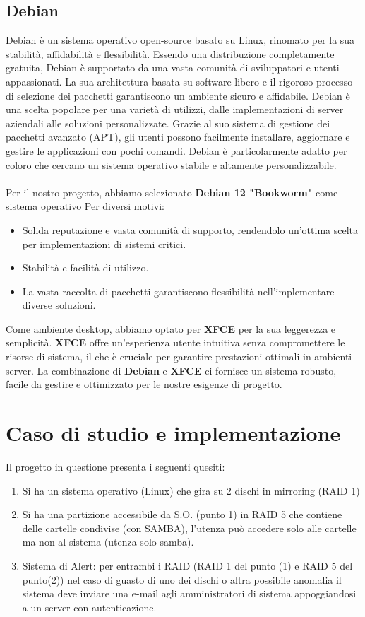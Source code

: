 \documentclass[11pt]{article}
\begin{document}
\subsection{Debian}
Debian è un sistema operativo open-source basato su Linux, rinomato per la sua stabilità, affidabilità e flessibilità. Essendo una distribuzione completamente gratuita, Debian è supportato da una vasta comunità di sviluppatori e utenti appassionati. La sua architettura basata su software libero e il rigoroso processo di selezione dei pacchetti garantiscono un ambiente sicuro e affidabile. Debian è una scelta popolare per una varietà di utilizzi, dalle implementazioni di server aziendali alle soluzioni personalizzate. Grazie al suo sistema di gestione dei pacchetti avanzato (APT), gli utenti possono facilmente installare, aggiornare e gestire le applicazioni con pochi comandi. Debian è particolarmente adatto per coloro che cercano un sistema operativo stabile e altamente personalizzabile.
\\\\
Per il nostro progetto, abbiamo selezionato \textbf{Debian 12 "Bookworm"} come sistema operativo Per diversi motivi:
\begin{itemize}
    \item Solida reputazione e vasta comunità di supporto, rendendolo un'ottima scelta per implementazioni di sistemi critici.
    \item Stabilità e facilità di utilizzo.
    \item La vasta raccolta di pacchetti garantiscono flessibilità nell'implementare diverse soluzioni.
\end{itemize}
Come ambiente desktop, abbiamo optato per \textbf{XFCE} per la sua leggerezza e semplicità. \textbf{XFCE} offre un'esperienza utente intuitiva senza compromettere le risorse di sistema, il che è cruciale per garantire prestazioni ottimali in ambienti server. La combinazione di \textbf{Debian} e \textbf{XFCE} ci fornisce un sistema robusto, facile da gestire e ottimizzato per le nostre esigenze di progetto.


\section{Caso di studio e implementazione}
Il progetto in questione presenta i seguenti quesiti:
\begin{enumerate}
    \item Si ha un sistema operativo (Linux) che gira su 2 dischi in mirroring (RAID 1)
    \item Si ha una partizione accessibile da S.O. (punto 1) in RAID 5 che contiene delle cartelle condivise (con SAMBA), l'utenza può accedere solo alle cartelle ma non al sistema (utenza solo samba).
    \item Sistema di Alert: per entrambi i RAID (RAID 1 del punto (1) e RAID 5 del punto(2)) nel caso di guasto di uno dei dischi o altra possibile anomalia il sistema deve inviare una e-mail agli amministratori di sistema
appoggiandosi a un server con autenticazione.
\end{enumerate}
\end{document}
